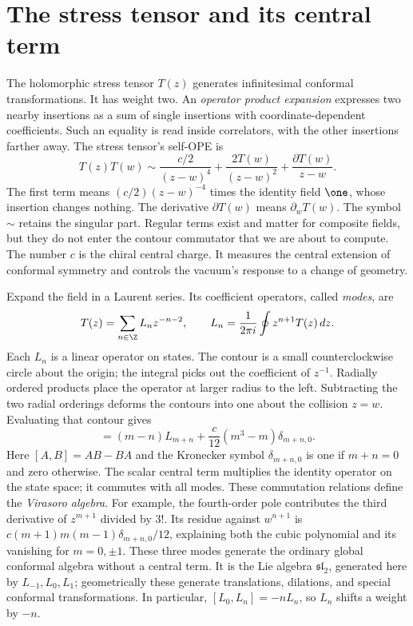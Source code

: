 \section{The stress tensor and its central term}

The holomorphic stress tensor $T(z)$ generates infinitesimal conformal
transformations. It has weight two. An \emph{operator product expansion}
expresses two nearby insertions as a sum of single insertions with
coordinate-dependent coefficients. Such an equality is read inside
correlators, with the other insertions farther away. The stress
tensor's self-OPE is
\begin{equation}
 T(z)T(w)\sim \frac{c/2}{(z-w)^4}
       +\frac{2T(w)}{(z-w)^2}+\frac{\partial T(w)}{z-w}.
 \label{eq:cft-TT}
\end{equation}
The first term means $(c/2)(z-w)^{-4}$ times the identity field
$\one$, whose insertion changes nothing. The derivative
$\partial T(w)$ means $\partial_w T(w)$.
The symbol $\sim$ retains the singular part. Regular terms exist and
matter for composite fields, but they do not enter the contour
commutator that we are about to compute. The number $c$ is the chiral
central charge. It measures the central extension of conformal
symmetry and controls the vacuum's response to a change of geometry.

Expand the field in a Laurent series. Its coefficient operators,
called \emph{modes}, are
\[
 T(z)=\sum_{n\in\Z}L_nz^{-n-2},\qquad
 L_n=\frac1{2\pi i}\oint z^{n+1}T(z)\,dz.
\]
Each $L_n$ is a linear operator on states. The contour is a small
counterclockwise circle about the origin; the integral picks out the
coefficient of $z^{-1}$. Radially ordered products place the operator
at larger radius to the left. Subtracting the two radial orderings
deforms the contours into one about the collision $z=w$.
Evaluating that contour gives
\begin{equation}
 [L_m,L_n]=(m-n)L_{m+n}
       +\frac{c}{12}(m^3-m)\delta_{m+n,0}.
 \label{eq:cft-virasoro}
\end{equation}
Here $[A,B]=AB-BA$ and the Kronecker symbol $\delta_{m+n,0}$ is
one if $m+n=0$ and zero otherwise. The scalar central term multiplies
the identity operator on the state space; it commutes with all modes.
These commutation relations define the \emph{Virasoro algebra}.
For example, the fourth-order pole contributes the third derivative
of $z^{m+1}$ divided by $3!$. Its residue against $w^{n+1}$ is
$c(m+1)m(m-1)\delta_{m+n,0}/12$, explaining both the cubic polynomial
and its vanishing for $m=0,\pm1$. These three modes generate the
ordinary global conformal algebra without a central term.
It is the Lie algebra $\mathfrak{sl}_2$, generated here by
$L_{-1},L_0,L_1$; geometrically these generate translations,
dilations, and special conformal transformations. In particular,
$[L_0,L_n]=-nL_n$, so $L_n$ shifts a weight by $-n$.


